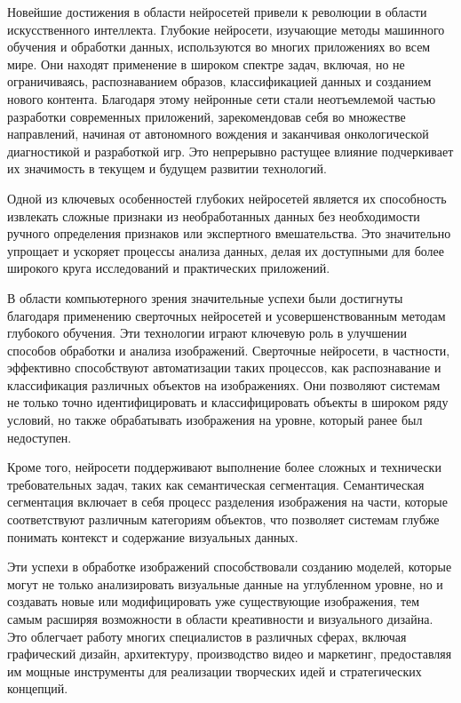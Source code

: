 \label{sec:intro}

Новейшие достижения в области нейросетей привели к революции в области искусственного интеллекта. Глубокие нейросети, изучающие методы машинного обучения и обработки данных, используются во многих приложениях во всем мире. Они находят применение в широком спектре задач, включая, но не ограничиваясь, распознаванием образов, классификацией данных и созданием нового контента. Благодаря этому нейронные сети стали неотъемлемой частью разработки современных приложений, зарекомендовав себя во множестве направлений, начиная от автономного вождения и заканчивая онкологической диагностикой и разработкой игр. Это непрерывно растущее влияние подчеркивает их значимость в текущем и будущем развитии технологий.

Одной из ключевых особенностей глубоких нейросетей является их способность извлекать сложные признаки из необработанных данных без необходимости ручного определения признаков или экспертного вмешательства. Это значительно упрощает и ускоряет процессы анализа данных, делая их доступными для более широкого круга исследований и практических приложений.

В области компьютерного зрения значительные успехи были достигнуты благодаря применению сверточных нейросетей и усовершенствованным методам глубокого обучения. Эти технологии играют ключевую роль в улучшении способов обработки и анализа изображений. Сверточные нейросети, в частности, эффективно способствуют автоматизации таких процессов, как распознавание и классификация различных объектов на изображениях. Они позволяют системам не только точно идентифицировать и классифицировать объекты в широком ряду условий, но также обрабатывать изображения на уровне, который ранее был недоступен.

Кроме того, нейросети поддерживают выполнение более сложных и технически требовательных задач, таких как семантическая сегментация. Семантическая сегментация включает в себя процесс разделения изображения на части, которые соответствуют различным категориям объектов, что позволяет системам глубже понимать контекст и содержание визуальных данных.

Эти успехи в обработке изображений способствовали созданию моделей, которые могут не только анализировать визуальные данные на углубленном уровне, но и создавать новые или модифицировать уже существующие изображения, тем самым расширяя возможности в области креативности и визуального дизайна. Это облегчает работу многих специалистов в различных сферах, включая графический дизайн, архитектуру, производство видео и маркетинг, предоставляя им мощные инструменты для реализации творческих идей и стратегических концепций.

